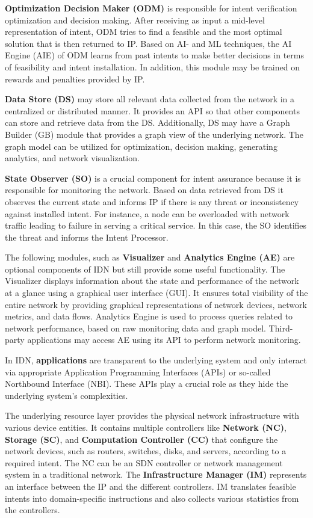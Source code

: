 \textbf{Optimization Decision Maker (ODM)} is responsible for intent verification optimization and decision making. After receiving as input a mid-level representation of intent, ODM tries to find a feasible and the most optimal solution that is then returned to IP. Based on AI- and ML techniques, the AI Engine (AIE) of ODM learns from past intents to make better decisions in terms of feasibility and intent installation. In addition, this module may be trained on rewards and penalties provided by IP.

\textbf{Data Store (DS)} may store all relevant data collected from the network in a centralized or distributed manner. It provides an API so that other components can store and retrieve data from the DS. Additionally, DS may have a Graph Builder (GB) module that provides a graph view of the underlying network. The graph model can be utilized for optimization, decision making, generating analytics, and network visualization.

\textbf{State Observer (SO)} is a crucial component for intent assurance because it is responsible for monitoring the network. Based on data retrieved from DS it observes the current state and informs IP if there is any threat or inconsistency against installed intent. For instance, a node can be overloaded with network traffic leading to failure in serving a critical service. In this case, the SO identifies the threat and informs the Intent Processor.

The following modules, such as \textbf{Visualizer} and \textbf{Analytics Engine (AE)} are optional components of IDN but still provide some useful functionality. The Visualizer displays information about the state and performance of the network at a glance using a graphical user interface (GUI). It ensures total visibility of the entire network by providing graphical representations of network devices, network metrics, and data flows. Analytics Engine is used to process queries related to network performance, based on raw monitoring data and graph model. Third-party applications may access AE using its API to perform network monitoring.

In IDN, \textbf{applications} are transparent to the underlying system and only interact via appropriate Application Programming Interfaces (APIs) or so-called Northbound Interface (NBI). These APIs play a crucial role as they hide the underlying system's complexities.

The underlying resource layer provides the physical network infrastructure with various device entities. It contains multiple controllers like \textbf{Network (NC)}, \textbf{Storage (SC)}, and \textbf{Computation Controller (CC)} that configure the network devices, such as routers, switches, disks, and servers, according to a required intent. The NC can be an SDN controller or network management system in a traditional network. The \textbf{Infrastructure Manager (IM)} represents an interface between the IP and the different controllers. IM translates feasible intents into domain-specific instructions and also collects various statistics from the controllers.

